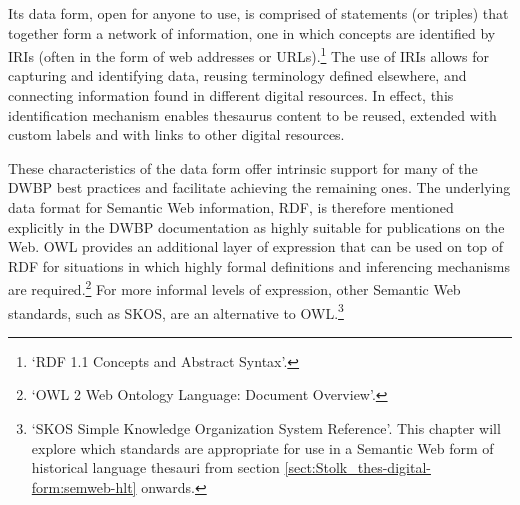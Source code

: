 Its data form, open for anyone to use, 
is comprised of statements (or triples) that together form a network of information, one in which concepts are identified by IRIs (often in the form of web addresses or URLs).\footnote{`RDF 1.1 Concepts and Abstract Syntax'.}
The use of IRIs allows for capturing and identifying data, %
reusing terminology defined elsewhere, and connecting information found in different digital resources. In effect, this identification mechanism enables thesaurus content to be reused, extended with custom labels and with links to other digital resources.
\begin{comment}
separates representation from identification;\footnote{Alternative labels can be attributed to the same item, or IRI, which allows resources to be used in multilingual contexts.}
enables machines to interpret stored information through common and well understood terminology;\footnote{See DWBP.}
allows for additional information to be inferred from asserted statements;\footnote{See specifications for entailments in `RDF 1.1 Semantics'. A more accessible introduction is provided in chapter 6, `RDF and inferencing', in Allemang and Hendler, \textit{Semantic Web for the Working Ontologist}.}
and utilizes internet technology to share and refer to data.\footnote{See `RDF 1.1 Concepts and Abstract Syntax';
and Berners-Lee, `Linked Data: Design Issues'.%
}
%
\end{comment}
These characteristics of the data form offer intrinsic support for many of the DWBP best practices and facilitate achieving the remaining ones. The underlying data format for Semantic Web information, RDF, is therefore mentioned explicitly in the DWBP documentation as highly suitable for publications on the Web. OWL provides an additional layer of expression that can be used on top of RDF for situations in which highly formal definitions and inferencing mechanisms are required.\footnote{`OWL 2 Web Ontology Language: Document Overview'.} %
For more informal levels of expression, other Semantic Web standards, such as SKOS, are an alternative to OWL.\footnote{`SKOS Simple Knowledge Organization System Reference'. This chapter will explore which standards are appropriate for use in a Semantic Web form of historical language thesauri from section \ref{sect:Stolk_thes-digital-form:semweb-hlt} onwards.}


